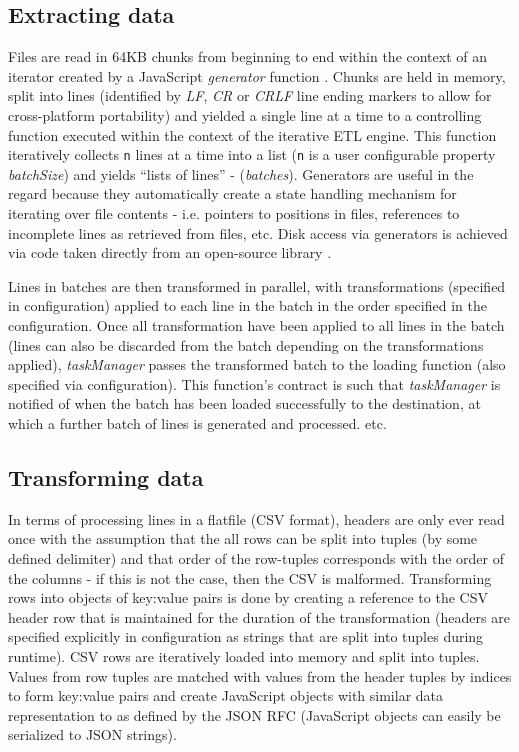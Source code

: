 \subsection{Extracting data}
Files are read in 64KB chunks from beginning to end within the context of an iterator created by a JavaScript \textit{generator} function \cite{mozillaGenerators}. Chunks are held in memory, split into lines (identified by \textit{LF}, \textit{CR} or \textit{CRLF} line ending markers to allow for cross-platform portability) and yielded a single line at a time to a controlling function executed within the context of the iterative ETL engine. This function iteratively collects \texttt{n} lines at a time into a list (\texttt{n} is a user configurable property \textit{batchSize}) and yields ``lists of lines'' - (\textit{batches}). Generators are useful in the regard because they automatically create a state handling mechanism for iterating over file contents - i.e. pointers to positions in files, references to incomplete lines as retrieved from files, etc. Disk access via generators is achieved via code taken directly from an open-source library \cite{bower16}.

Lines in batches are then transformed in parallel, with transformations (specified in configuration) applied to each line in the batch in the order specified in the configuration. Once all transformation have been applied to all lines in the batch (lines can also be discarded from the batch depending on the transformations applied), \textit{taskManager} passes the transformed batch to the loading function (also specified via configuration). This function's contract is such that \textit{taskManager} is notified of when the batch has been loaded successfully to the destination, at which a further batch of lines is generated and processed. etc.

\subsection{Transforming data}
In terms of processing lines in a flatfile (CSV format), headers are only ever read once with the assumption that the all rows can be split into tuples (by some defined delimiter) and that order of the row-tuples corresponds with the order of the columns - if this is not the case, then the CSV is malformed. Transforming rows into objects of key:value pairs is done by creating a reference to the CSV header row that is maintained for the duration of the transformation (headers are specified explicitly in configuration as strings that are split into tuples during runtime). CSV rows are iteratively loaded into memory and split into tuples. Values from row tuples are matched with values from the header tuples by indices to form key:value pairs and create JavaScript objects with similar data representation to as defined by the JSON RFC \cite{rfc7159} (JavaScript objects can easily be serialized to JSON strings).

